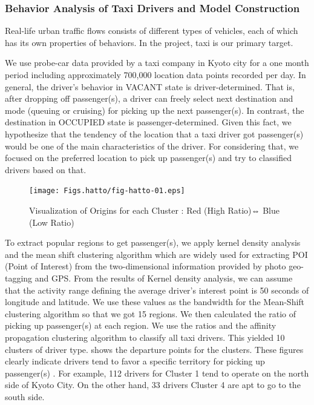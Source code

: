 \subsubsection{Behavior Analysis of Taxi Drivers and Model Construction}

Real-life urban traffic flows consists of different types of vehicles, each of which has its own properties of behaviors. In the project, taxi is our primary target. 

We use probe-car data provided by a taxi company in Kyoto city for a one month period including approximately 700,000 location data points recorded per day.
%
In general, the driver’s behavior in VACANT state is driver-determined. That is, after dropping off passenger(s), a driver can freely select next destination and mode (queuing or cruising) for picking up the next passenger(s). In contrast, the destination in OCCUPIED state is passenger-determined. Given this fact, we hypothesize that the tendency of the location that a taxi driver got passenger(s) would be one of the main characteristics of the driver. For considering that, we focused on the preferred location to pick up passenger(s) and try to classified drivers based on that. 

\begin{figure}
  \centering
  \texttt{[image: Figs.hatto/fig-hatto-01.eps]}
  \caption{Visualization of Origins for each Cluster : Red (High Ratio)⇔ Blue (Low Ratio)}
  \label{fig:Figs.hatto/fig-hatto-01.eps}
\end{figure}

To extract popular regions to get passenger(s), we apply kernel density analysis and the mean shift clustering algorithm which are widely used for extracting POI (Point of Interest) from the two-dimensional information provided by photo geo-tagging and GPS. From the results of Kernel density analysis, we can assume that the activity range defining the average driver’s interest point is 50 seconds of longitude and latitude.  We use these values as the bandwidth for the Mean-Shift clustering algorithm so that we got 15 regions. We then calculated the ratio of picking up passenger(s) at each region. We use the ratios and the affinity propagation clustering algorithm to classify all taxi drivers. This yielded 10 clusters of driver type.
 shows the departure points for the clusters. These figures clearly indicate drivers tend to favor a specific territory for picking up passenger(s) . For example, 112 drivers for Cluster 1 tend to operate on the north side of Kyoto City. On the other hand, 33 drivers Cluster 4 are apt to go to the south side. 

